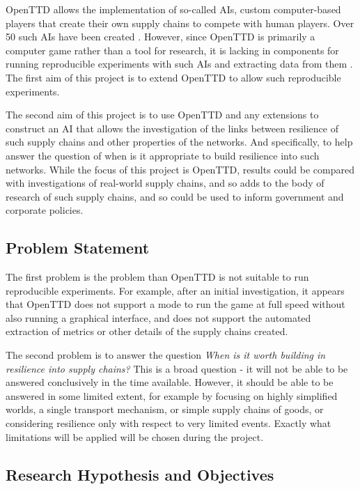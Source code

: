 \documentclass[a4paper,11pt]{article}
\begin{document}
OpenTTD allows the implementation of so-called AIs, custom computer-based players that create their own supply chains to compete with human players. Over 50 such AIs have been created \cite{openttdAIs}. However, since OpenTTD is primarily a computer game rather than a tool for research, it is lacking in components for running reproducible experiments with such AIs and extracting data from them \cite{openttdNoHeadless}. The first aim of this project is to extend OpenTTD to allow such reproducible experiments.

The second aim of this project is to use OpenTTD and any extensions to construct an AI that allows the investigation of the links between resilience of such supply chains and other properties of the networks. And specifically, to help answer the question of when is it appropriate to build resilience into such networks. While the focus of this project is OpenTTD, results could be compared with investigations of real-world supply chains, and so adds to the body of research of such supply chains, and so could be used to inform government and corporate policies.

\subsection{Problem Statement}

The first problem is the problem than OpenTTD is not suitable to run reproducible experiments. For example, after an initial investigation, it appears that OpenTTD does not support a mode to run the game at full speed without also running a graphical interface, and does not support the automated extraction of metrics or other details of the supply chains created.

The second problem is to answer the question \emph{When is it worth building in resilience into supply chains?} This is a broad question - it will not be able to be answered conclusively in the time available. However, it should be able to be answered in some limited extent, for example by focusing on highly simplified worlds, a single transport mechanism, or simple supply chains of goods, or considering resilience only with respect to very limited events. Exactly what limitations will be applied will be chosen during the project.

\subsection{Research Hypothesis and Objectives}
\end{document}
